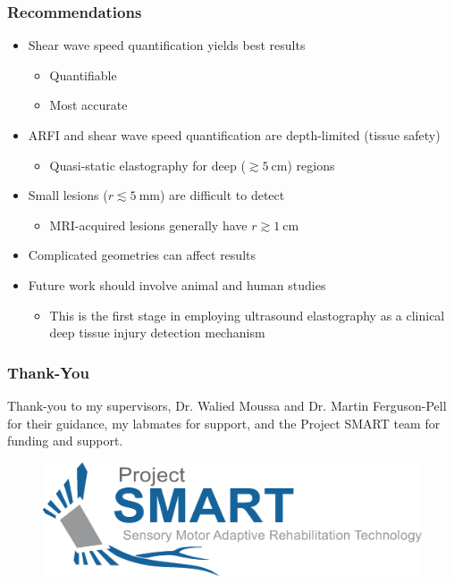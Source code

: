 \documentclass{beamer}
\begin{document}
		\begin{frame}
			\frametitle{Recommendations}
			\begin{itemize}
				\item \alert{Shear wave speed quantification} yields best results
				\begin{itemize}
					\item Quantifiable
					\item Most accurate
				\end{itemize}
				\item ARFI and shear wave speed quantification are depth-limited (tissue safety)
				\begin{itemize}
					\item Quasi-static elastography for deep ($\gtrsim \SI{5}{\cm}$) regions
				\end{itemize}
				\item Small lesions ($r \lesssim \SI{5}{\mm}$) are difficult to detect
				\begin{itemize}
					\item MRI-acquired lesions generally have $r \gtrsim \SI{1}{\cm}$
				\end{itemize}
				\item Complicated geometries can affect results
				\item Future work should involve \alert{animal} and \alert{human} studies
				\begin{itemize}
					\item This is the first stage in employing ultrasound elastography as a clinical deep tissue injury detection mechanism
				\end{itemize}
			\end{itemize}
		\end{frame}
		
		\begin{frame}
			\frametitle{Thank-You}
			\vspace{1cm}
			Thank-you to my supervisors, \alert{Dr. Walied Moussa} and \alert{Dr. Martin Ferguson-Pell} for their guidance, my labmates for support, and the Project SMART team for funding and support.
			\vspace{1cm}
			\begin{figure}
				\includegraphics[width=\textwidth]{assets/SMART.eps}
			\end{figure}
		\end{frame}
\end{document}
